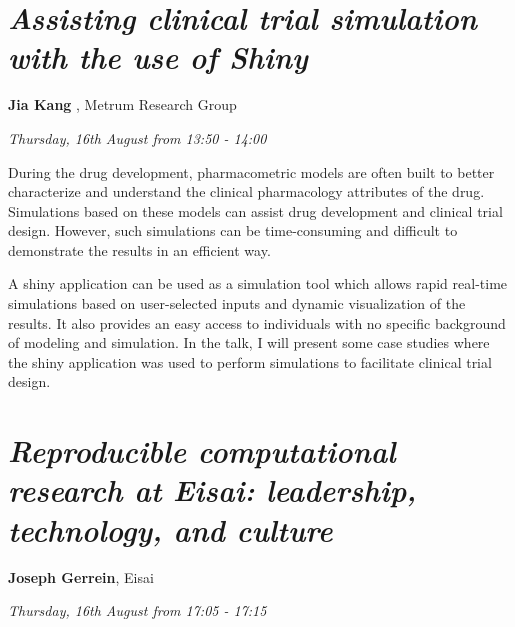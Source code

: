\documentclass[]{book}
\theoremstyle{definition}
\theoremstyle{definition}
\theoremstyle{definition}
\theoremstyle{remark}
\begin{document}
\hypertarget{assisting-clinical-trial-simulation-with-the-use-of-shiny}{%
\section{\texorpdfstring{\emph{Assisting clinical trial simulation with
the use of
Shiny}}{Assisting clinical trial simulation with the use of Shiny}}\label{assisting-clinical-trial-simulation-with-the-use-of-shiny}}

\textbf{Jia Kang }, Metrum Research Group

\emph{Thursday, 16th August from 13:50 - 14:00}

During the drug development, pharmacometric models are often built to
better characterize and understand the clinical pharmacology attributes
of the drug. Simulations based on these models can assist drug
development and clinical trial design. However, such simulations can be
time-consuming and difficult to demonstrate the results in an efficient
way.

A shiny application can be used as a simulation tool which allows rapid
real-time simulations based on user-selected inputs and dynamic
visualization of the results. It also provides an easy access to
individuals with no specific background of modeling and simulation. In
the talk, I will present some case studies where the shiny application
was used to perform simulations to facilitate clinical trial design.

\hypertarget{reproducible-computational-research-at-eisai-leadership-technology-and-culture}{%
\section{\texorpdfstring{\emph{Reproducible computational research at
Eisai: leadership, technology, and
culture}}{Reproducible computational research at Eisai: leadership, technology, and culture}}\label{reproducible-computational-research-at-eisai-leadership-technology-and-culture}}

\textbf{Joseph Gerrein}, Eisai

\emph{Thursday, 16th August from 17:05 - 17:15}
\end{document}
